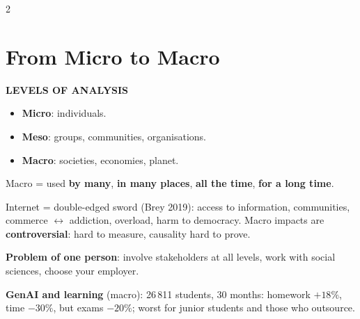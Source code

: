 \documentclass[a4paper,9pt]{extarticle}
\begin{document}

\thispagestyle{fancy}



\begin{multicols}{2}


\section{From Micro to Macro}


\begin{definition}

\textbf{LEVELS OF ANALYSIS}

\begin{itemize}

\item \textbf{Micro}: individuals.

\item \textbf{Meso}: groups, communities, organisations.

\item \textbf{Macro}: societies, economies, planet.

\end{itemize}

Macro = used \textbf{by many}, \textbf{in many places}, \textbf{all the time}, \textbf{for a
long time}.

\end{definition}


\begin{important}

Internet = double-edged sword (Brey 2019): access to information, communities, commerce
$\leftrightarrow$ addiction, overload, harm to democracy. Macro impacts are
\textbf{controversial}: hard to measure, causality hard to prove.

\textbf{Problem of one person}: involve stakeholders at all levels, work with social sciences,
choose your employer.

\end{important}


\begin{example}

\textbf{GenAI and learning} (macro): 26\,811 students, 30 months: homework $+18\%$, time
$-30\%$, but exams $-20\%$; worst for junior students and those who outsource.

\end{example}



\end{multicols}
\end{document}

